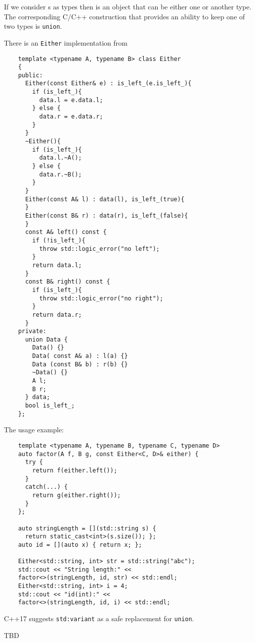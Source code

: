 \begin{example}[Sum][\textbf{C++}]
  \label{ex:cpp_sum}
  If we consider s as types then
   is an object that can be either one or another
  type. The corresponding C/C++ construction that provides an ability
  to keep one of two types is \texttt{union}.

  There is an \texttt{Either} implementation from
  \begin{verbatim}
    template <typename A, typename B> class Either
    {
    public:
      Either(const Either& e) : is_left_(e.is_left_){
        if (is_left_){
          data.l = e.data.l;      
        } else {
          data.r = e.data.r;      
        }    
      }
      ~Either(){
        if (is_left_){
          data.l.~A();      
        } else {
          data.r.~B();      
        }        
      }      
      Either(const A& l) : data(l), is_left_(true){
      }
      Either(const B& r) : data(r), is_left_(false){
      }
      const A& left() const {
        if (!is_left_){
          throw std::logic_error("no left");      
        }    
        return data.l;    
      }
      const B& right() const {
        if (is_left_){
          throw std::logic_error("no right");      
        }    
        return data.r;    
      }
    private:
      union Data {
        Data() {}
        Data( const A& a) : l(a) {}
        Data (const B& b) : r(b) {}
        ~Data() {}
        A l;
        B r;
      } data;       
      bool is_left_;  
    };
  \end{verbatim}
  The usage example:
  \begin{verbatim}
    template <typename A, typename B, typename C, typename D>
    auto factor(A f, B g, const Either<C, D>& either) {
      try {
        return f(either.left());               
      }
      catch(...) {
        return g(either.right());                              
      }
    };
    
    auto stringLength = [](std::string s) {
      return static_cast<int>(s.size()); };
    auto id = [](auto x) { return x; };
          
    Either<std::string, int> str = std::string("abc");
    std::cout << "String length:" <<
    factor<>(stringLength, id, str) << std::endl;
    Either<std::string, int> i = 4;
    std::cout << "id(int):" <<
    factor<>(stringLength, id, i) << std::endl;
  \end{verbatim}

  C++17 suggests \texttt{std:variant} as a safe replacement
  for \texttt{union}.
\end{example}
TBD
